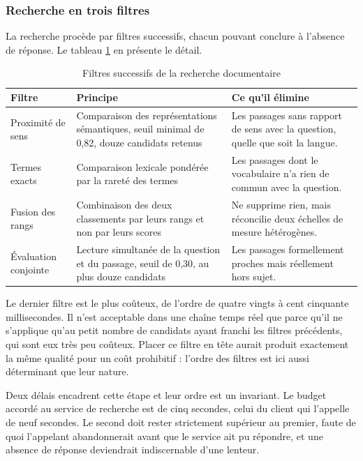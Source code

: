 \subsubsection{Recherche en trois filtres}

La recherche procède par filtres successifs, chacun pouvant conclure à l'absence de réponse. Le tableau \ref{tab:rag-filtres} en présente le détail.

\begin{table}[H]
\centering
\renewcommand{\arraystretch}{1.2}
\begin{tabular}{|p{3.0cm}|p{5.3cm}|p{6.2cm}|}
\hline
\textbf{Filtre} & \textbf{Principe} & \textbf{Ce qu'il élimine} \\
\hline
Proximité de sens & Comparaison des représentations sémantiques, seuil minimal de 0,82, douze candidats retenus & Les passages sans rapport de sens avec la question, quelle que soit la langue. \\
\hline
Termes exacts & Comparaison lexicale pondérée par la rareté des termes \cite{bm25} & Les passages dont le vocabulaire n'a rien de commun avec la question. \\
\hline
Fusion des rangs & Combinaison des deux classements par leurs rangs et non par leurs scores \cite{rrf} & Ne supprime rien, mais réconcilie deux échelles de mesure hétérogènes. \\
\hline
Évaluation conjointe & Lecture simultanée de la question et du passage, seuil de 0,30, au plus douze candidats & Les passages formellement proches mais réellement hors sujet. \\
\hline
\end{tabular}
\caption{Filtres successifs de la recherche documentaire}
\label{tab:rag-filtres}
\end{table}

Le dernier filtre est le plus coûteux, de l'ordre de quatre vingts à cent cinquante millisecondes. Il n'est acceptable dans une chaîne temps réel que parce qu'il ne s'applique qu'au petit nombre de candidats ayant franchi les filtres précédents, qui sont eux très peu coûteux. Placer ce filtre en tête aurait produit exactement la même qualité pour un coût prohibitif : l'ordre des filtres est ici aussi déterminant que leur nature.

Deux délais encadrent cette étape et leur ordre est un invariant. Le budget accordé au service de recherche est de cinq secondes, celui du client qui l'appelle de neuf secondes. Le second doit rester strictement supérieur au premier, faute de quoi l'appelant abandonnerait avant que le service ait pu répondre, et une absence de réponse deviendrait indiscernable d'une lenteur.

